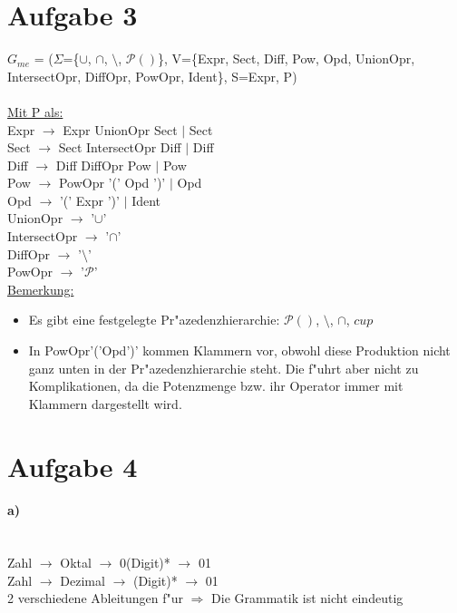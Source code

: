 \documentclass[12pt]{article}
\begin{document}
\section*{Aufgabe 3}
$G_{me}$ = ($\Sigma$=\{$\cup$, $\cap$, $\setminus$, $\mathcal{P}()$\}, V=\{Expr, Sect, Diff, Pow, Opd, UnionOpr, IntersectOpr, DiffOpr, PowOpr, Ident\}, S=Expr, P)\\
\ \\
\noindent \underline{Mit P als:}\\
Expr $\rightarrow$ Expr UnionOpr Sect $|$ Sect\\
Sect $\rightarrow$ Sect IntersectOpr Diff $|$ Diff\\
Diff $\rightarrow$ Diff DiffOpr Pow $|$ Pow\\
Pow $\rightarrow$ PowOpr '(' Opd ')' $|$ Opd\\
Opd $\rightarrow$ '(' Expr ')' $|$ Ident\\
UnionOpr $\rightarrow$ '$\cup$'\\
IntersectOpr $\rightarrow$ '$\cap$'\\
DiffOpr $\rightarrow$ '$\setminus$'\\
PowOpr $\rightarrow$ '$\mathcal{P}$'\\

\noindent \underline{Bemerkung:}
\begin{itemize}
\item Es gibt eine festgelegte Pr"azedenzhierarchie: $\mathcal{P}()$, $\setminus$, $\cap$, $cup$
\item In PowOpr'('Opd')' kommen Klammern vor, obwohl diese Produktion nicht ganz unten in der Pr"azedenzhierarchie steht. Die f"uhrt aber nicht zu Komplikationen, da die Potenzmenge bzw. ihr Operator immer mit Klammern dargestellt wird. 
\end{itemize}



\section*{Aufgabe 4}
\paragraph{a)}\ \\
	Zahl $\rightarrow$ Oktal $\rightarrow$ 0(Digit)* $\rightarrow$ 01 \\
	Zahl $\rightarrow$ Dezimal $\rightarrow$ (Digit)* $\rightarrow$ 01 \\
	2 verschiedene Ableitungen f"ur \dq $\Rightarrow$ Die Grammatik ist nicht eindeutig
	
\end{document}
